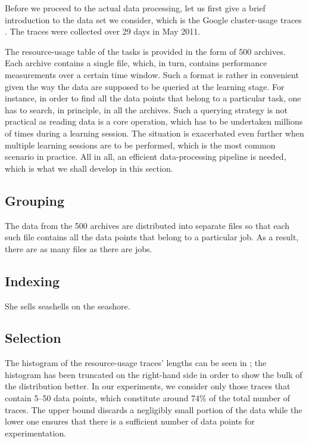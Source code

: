 Before we proceed to the actual data processing, let us first give a brief
introduction to the data set we consider, which is the Google cluster-usage
traces \cite{reiss2011}. The traces were collected over 29 days in May 2011.

The resource-usage table of the tasks is provided in the form of 500 archives.
Each archive contains a single  file, which, in turn, contains
performance measurements over a certain time window. Such a format is rather in
convenient given the way the data are supposed to be queried at the learning
stage. For instance, in order to find all the data points that belong to a
particular task, one has to search, in principle, in all the archives. Such a
querying strategy is not practical as reading data is a core operation, which
has to be undertaken millions of times during a learning session. The situation
is exacerbated even further when multiple learning sessions are to be performed,
which is the most common scenario in practice. All in all, an efficient
data-processing pipeline is needed, which is what we shall develop in this
section.

\subsection{Grouping}
The  data from the 500 archives are distributed into separate 
files so that each such file contains all the data points that belong to a
particular job. As a result, there are as many  files as there are jobs.

\subsection{Indexing}
She sells seashells on the seashore.

\subsection{Selection}

The histogram of the resource-usage traces' lengths can be seen in
; the histogram has been truncated on the right-hand side in
order to show the bulk of the distribution better. In our experiments, we
consider only those traces that contain 5--50 data points, which constitute
around 74\% of the total number of traces. The upper bound discards a negligibly
small portion of the data while the lower one ensures that there is a sufficient
number of data points for experimentation.

